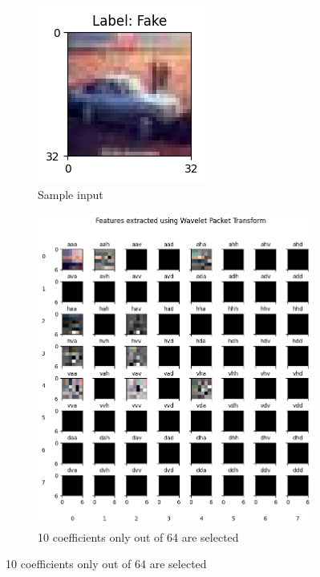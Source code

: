 \documentclass{svproc}
\begin{document}
\begin{figure}[H]
  \centering
  \begin{subfigure}{0.3\textwidth}
    \centering
    \includegraphics[width=0.9\linewidth]{figures/exp2_img.png}
    \caption{Sample input}
    \label{fig:exp2_sub1}
  \end{subfigure}
  \begin{subfigure}{0.5\textwidth}
    \centering
    \includegraphics[width=0.5\linewidth]{figures/exp2_wptdec.png}
    \caption{10 coefficients only out of 64 are selected}
    \label{fig:exp2_sub2}
  \end{subfigure}
  \caption{10 coefficients only out of 64 are selected}
  \label{fig:db2_dec_exp2}
\end{figure}
\end{document}

